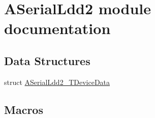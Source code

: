 \hypertarget{group___a_serial_ldd2__module}{}\section{A\+Serial\+Ldd2 module documentation}
\label{group___a_serial_ldd2__module}
\subsection*{Data Structures}
\begin{DoxyCompactItemize}
\item 
struct \hyperlink{struct_a_serial_ldd2___t_device_data}{A\+Serial\+Ldd2\+\_\+\+T\+Device\+Data}
\end{DoxyCompactItemize}
\subsection*{Macros}
